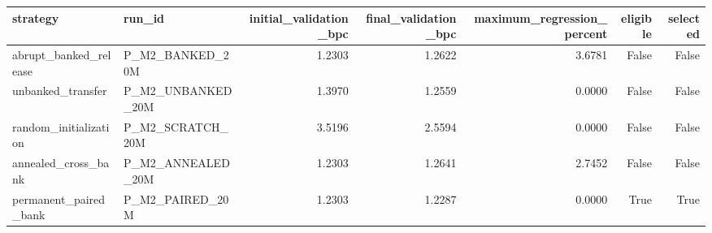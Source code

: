 \begin{tabular}{llrrrrr}
\toprule
strategy & run\_id & initial\_validation\_bpc & final\_validation\_bpc & maximum\_regression\_percent & eligible & selected \\
\midrule
abrupt\_banked\_release & P\_M2\_BANKED\_20M & 1.2303 & 1.2622 & 3.6781 & False & False \\
unbanked\_transfer & P\_M2\_UNBANKED\_20M & 1.3970 & 1.2559 & 0.0000 & False & False \\
random\_initialization & P\_M2\_SCRATCH\_20M & 3.5196 & 2.5594 & 0.0000 & False & False \\
annealed\_cross\_bank & P\_M2\_ANNEALED\_20M & 1.2303 & 1.2641 & 2.7452 & False & False \\
permanent\_paired\_bank & P\_M2\_PAIRED\_20M & 1.2303 & 1.2287 & 0.0000 & True & True \\
\bottomrule
\end{tabular}
